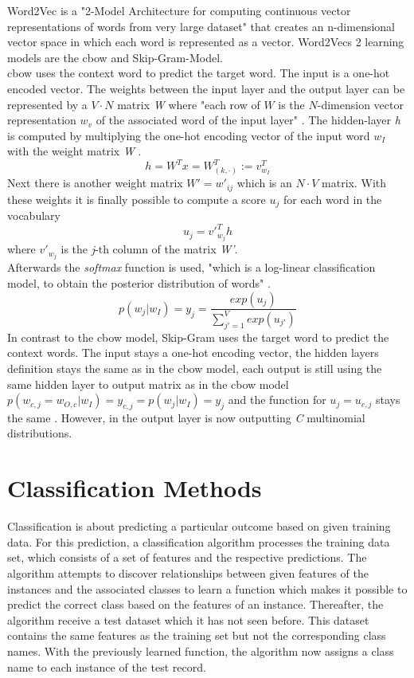 \documentclass[a4paper, 11pt,titlepage,oneside,openany]{book}
\begin{document}
Word2Vec is a "2-Model Architecture for computing continuous vector representations of words from very large dataset"\cite{effiecientestimation} that creates an n-dimensional vector space in which each word is represented as a vector. Word2Vecs 2 learning models are the \gls{cbow} and Skip-Gram-Model.\\
\noindent \gls{cbow} uses the context word to predict the target word. The input is a one-hot encoded vector. The weights between the input layer and the output layer can be represented by a $V \cdot N$ matrix \textit{W} where "each row of $W$ is the $N$-dimension vector representation $w_v$ of the associated word of the input layer" \cite{word2vecparam}. The hidden-layer \textit{h} is computed by multiplying the one-hot encoding vector of the input word $w_I$ with the weight matrix \textit{W} \cite{word2vecparam}.
\[
h=W^Tx=W_{(k, \cdot)}^{T}:=v_{w_I}^{T}
\] 
Next there is another weight matrix $W'={w'_{ij}}$ which is an $N \cdot V$ matrix. With these weights it is finally possible to compute a score $u_j$ for each word in the vocabulary \cite{word2vecparam}
\[
u_{j}={v'}_{w_j}^{T}h
\] where ${v'}_{w_j}$ is the \textit{j}-th column of the matrix \textit{W'}. \\
\newpage
\noindent Afterwards the \textit{softmax} function is used, "which is a log-linear classification model, to obtain the posterior distribution of words" \cite{word2vecparam}.
\[
p(w_j|w_I)=y_j=\frac{exp(u_j)}{\sum_{j'=1}^V exp(u_{j'})}
\] 
\indent In contrast to the \gls{cbow} model,  Skip-Gram uses the target word to predict the context words. The input stays a one-hot encoding vector, the hidden layers definition stays the same as in the \gls{cbow} model, each output is still using the same hidden layer to output matrix as in the \gls{cbow} model $p(w_{c,j}=w_{O,c}|w_I)=y_{c,j} = p(w_j|w_I)=y_j$ and the function for $u_j=u_{c,j}$ stays the same \cite{word2vecparam}. However, in the output layer is now outputting \textit{C} multinomial distributions.  

\section{Classification Methods}
Classification is about predicting a particular outcome based on given training data. For this prediction, a classification algorithm processes the training data set, which consists of a set of features and the respective predictions. The algorithm attempts to discover relationships between given features  of the instances and the associated classes to learn a function which makes it possible to predict the correct class based on the features of an instance. Thereafter, the algorithm receive a test dataset which it has not seen before. This dataset contains the same features as the training set but not the corresponding class names. With the previously learned function, the algorithm now assigns a class name to each instance  of the test record. \\
\end{document}
